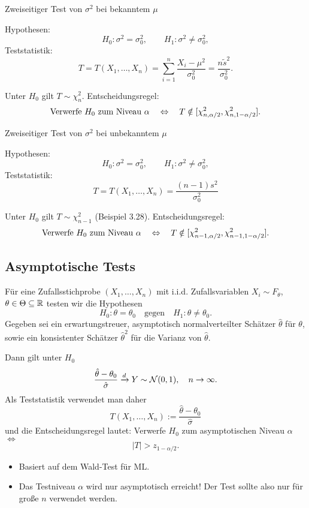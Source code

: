 \begin{mdframed}
  Zweiseitiger Test von $\sigma^2$ bei bekanntem $\mu$

  Hypothesen:
  \[ H_0 : \sigma^2 = \sigma_0^2, \qquad H_1 : \sigma^2 \ne \sigma_0^2, \]
  Teststatistik:
  \[ T = T(X_1, \ldots, X_n) =
    \sum_{i=1}^n \frac{X_i-\mu^2}{\sigma_0^2}
    = \frac{n \tilde{s}^2}{\sigma_0^2}. \]

  Unter $H_0$ gilt $T \sim \chi_n^2$. Entscheidungsregel:
  \[ \text{Verwerfe $H_0$ zum Niveau $\alpha$} \quad \Leftrightarrow \quad T \notin
    [\chi_{n,\alpha/2}^2, \chi_{n,1-\alpha/2}^2]. \]  
\end{mdframed}

\clearpage

\begin{mdframed}
  Zweiseitiger Test von $\sigma^2$ bei unbekanntem $\mu$

  Hypothesen:
  \[ H_0 : \sigma^2 = \sigma_0^2, \qquad H_1 : \sigma^2 \ne \sigma_0^2, \]
  Teststatistik:
  \[ T = T(X_1, \ldots, X_n) = \frac{(n-1)s^2}{\sigma_0^2} \]
  
  Unter $H_0$ gilt $T \sim \chi_{n-1}^2$ (Beispiel 3.28). Entscheidungsregel:
  \[ \text{Verwerfe $H_0$ zum Niveau $\alpha$} \quad \Leftrightarrow \quad T \notin
    [\chi_{n-1,\alpha/2}^2, \chi_{n-1,1-\alpha/2}^2]. \]  
\end{mdframed}

\subsection{Asymptotische Tests}
Für eine Zufallsstichprobe $(X_1, \ldots, X_n)$ mit i.i.d. Zufallsvariablen $X_i
\sim F_\theta$, $\theta \in \Theta \subseteq \mathbb{R}$ testen wir die Hypothesen
\[ H_0 : \theta = \theta_0 \quad \text{gegen} \quad H_1 : \theta \ne
  \theta_0. \]
Gegeben sei ein erwartungstreuer, asymptotisch normalverteilter Schätzer
$\hat{\theta}$ für $\theta$, sowie ein konsistenter Schätzer $\hat{\theta}^2$
für die Varianz von $\hat{\theta}$.

Dann gilt unter $H_0$
\[ \frac{\hat{\theta}-\theta_0}{\hat{\sigma}} \xrightarrow{d} 
  Y \sim \mathcal{N}(0,1), \quad n \to \infty. \]
Als Teststatistik verwendet man daher
\[ T(X_1, \ldots, X_n) := \frac{\hat{\theta}-\theta_0}{\hat{\sigma}} \]
und die Entscheidungsregel lautet: Verwerfe $H_0$ zum asymptotischen Niveau
$\alpha$ $\Leftrightarrow$
\[ |T| > z_{1-\alpha/2}. \]

\begin{rmrk*}
  \begin{itemize}
  \item Basiert auf dem Wald-Test für ML.
  \item Das Testniveau $\alpha$ wird nur asymptotisch erreicht! Der Test sollte
    also nur für große $n$ verwendet werden.
  \end{itemize}
\end{rmrk*}

